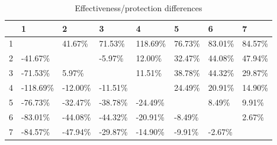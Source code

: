 \begin{table}[ht]
\centering
\begin{tabular}{rlllllll}
  \hline
 & 1 & 2 & 3 & 4 & 5 & 6 & 7 \\ 
  \hline
1 &  & 41.67\% & 71.53\% & 118.69\% & 76.73\% & 83.01\% & 84.57\% \\ 
  2 & -41.67\% &  & -5.97\% & 12.00\% & 32.47\% & 44.08\% & 47.94\% \\ 
  3 & -71.53\% & 5.97\% &  & 11.51\% & 38.78\% & 44.32\% & 29.87\% \\ 
  4 & -118.69\% & -12.00\% & -11.51\% &  & 24.49\% & 20.91\% & 14.90\% \\ 
  5 & -76.73\% & -32.47\% & -38.78\% & -24.49\% &  & 8.49\% & 9.91\% \\ 
  6 & -83.01\% & -44.08\% & -44.32\% & -20.91\% & -8.49\% &  & 2.67\% \\ 
  7 & -84.57\% & -47.94\% & -29.87\% & -14.90\% & -9.91\% & -2.67\% &  \\ 
   \hline
\end{tabular}
\caption{Effectiveness/protection differences} 
\end{table}
